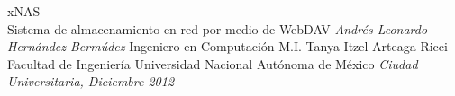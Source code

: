 \documentclass[dvips,letterpaper,12pt]{report}
\begin{document}


\thesistitle
	{xNAS \\
	 Sistema de almacenamiento en red por medio de WebDAV}
	{\emph{Andr\'{e}s Leonardo Hern\'{a}ndez Berm\'{u}dez}}
	{Ingeniero en Computaci\'{o}n}
	{M.I. Tanya Itzel Arteaga Ricci}
	{Facultad de Ingenier\'{i}a}
	{Universidad Nacional Aut\'{o}noma de M\'{e}xico}
	{\emph{Ciudad Universitaria, Diciembre 2012}}







	









\appendix

\end{document}
